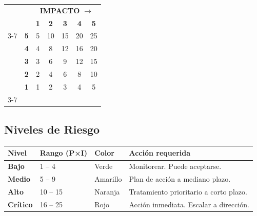\documentclass[11pt,a4paper]{article}
\begin{document}
\begin{center}
\renewcommand{\arraystretch}{1.9}
\setlength{\tabcolsep}{8pt}
\begin{tabular}{@{} c c | c c c c c @{}}
\multicolumn{2}{c}{} & \multicolumn{5}{c}{\textbf{IMPACTO} $\longrightarrow$} \\
\multicolumn{2}{c}{} & \textbf{1} & \textbf{2} & \textbf{3} & \textbf{4} & \textbf{5} \\
\cline{3-7}
\multirow{5}{*}{\rotatebox[origin=c]{90}{\textbf{PROBABILIDAD} $\longrightarrow$}}
 & \textbf{5} & \cellcolor{nivelmedio}5 & \cellcolor{nivelalto}10 & \cellcolor{nivelalto}15 & \cellcolor{nivelcritico}20 & \cellcolor{nivelcritico}25 \\
 & \textbf{4} & \cellcolor{nivelbajo}4 & \cellcolor{nivelmedio}8 & \cellcolor{nivelalto}12 & \cellcolor{nivelcritico}16 & \cellcolor{nivelcritico}20 \\
 & \textbf{3} & \cellcolor{nivelbajo}3 & \cellcolor{nivelmedio}6 & \cellcolor{nivelmedio}9 & \cellcolor{nivelalto}12 & \cellcolor{nivelalto}15 \\
 & \textbf{2} & \cellcolor{nivelbajo}2 & \cellcolor{nivelbajo}4 & \cellcolor{nivelmedio}6 & \cellcolor{nivelmedio}8 & \cellcolor{nivelalto}10 \\
 & \textbf{1} & \cellcolor{nivelbajo}1 & \cellcolor{nivelbajo}2 & \cellcolor{nivelbajo}3 & \cellcolor{nivelbajo}4 & \cellcolor{nivelmedio}5 \\
\cline{3-7}
\end{tabular}
\end{center}

\subsection{Niveles de Riesgo}\label{sec:niveles}

\begin{center}
\renewcommand{\arraystretch}{1.4}
\begin{tabularx}{\textwidth}{@{} p{3cm} p{2.5cm} p{3.5cm} X @{}}
\toprule
\textbf{Nivel} & \textbf{Rango (P×I)} & \textbf{Color} & \textbf{Acción requerida} \\
\midrule
\cellcolor{nivelbajo} \textbf{Bajo} & 1 -- 4 & Verde & Monitorear. Puede aceptarse. \\
\cellcolor{nivelmedio} \textbf{Medio} & 5 -- 9 & Amarillo & Plan de acción a mediano plazo. \\
\cellcolor{nivelalto} \textbf{Alto} & 10 -- 15 & Naranja & Tratamiento prioritario a corto plazo. \\
\cellcolor{nivelcritico} \textbf{Crítico} & 16 -- 25 & Rojo & Acción inmediata. Escalar a dirección. \\
\bottomrule
\end{tabularx}
\end{center}
\end{document}
